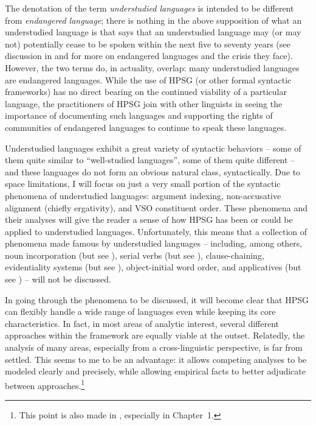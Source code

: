 \documentclass[output=paper
 	        ,biblatex
                ,babelshorthands
                ,newtxmath
                ,draftmode
                ,colorlinks, citecolor=brown
]{langscibook}
\begin{document}
The denotation of the term \textit{understudied languages} is intended to be different from \textit{endangered language}; there is nothing in the above supposition of what an understudied language is that says that an understudied language may (or may not) potentially cease to be spoken within the next five to seventy years (see discussion in \citealt{krauss92} and \citealt{SL13} for more on endangered languages and the crisis they face).  However, the two terms do, in actuality, overlap: many understudied languages are endangered languages. While the use of HPSG (or other formal syntactic frameworks) has no direct bearing on the continued viability of a particular language, the practitioners of HPSG join with other linguists in seeing the importance of documenting such languages and supporting the rights of communities of endangered languages to continue to speak these languages.       

\largerpage
Understudied languages exhibit a great variety of syntactic behaviors -- some of them quite similar to ``well-studied languages'', some of them quite different -- and these languages do not form an obvious natural class, syntactically. Due to space limitations, I will focus on just a very small portion of the syntactic phenomena of understudied languages: argument indexing, non-accusative alignment (chiefly ergativity), and VSO constituent order. These phenomena and their analyses will give the reader a sense of how HPSG has been or could be applied to understudied languages. Unfortunately, this means that a collection of phenomena made famous by understudied languages -- including, among others, noun incorporation (but see \citealt{malouf99,runara03,ball05afla,ball05hpsg,ball08thesis}), serial verbs (but see \citealt{muansuwan01,muansuwan02,KDHB2007a,ML2009a,lee14}), clause-chaining, evidentiality systems (but see \citealt{lee12}), object-initial word order, and applicatives (but see \citealt{runara03,ball08thesis,ball10}) -- will not be discussed.

In going through the phenomena to be discussed, it will become clear that HPSG can flexibly handle a wide range of languages even while keeping its core characteristics. In fact, in most areas of analytic interest, several different approaches within the framework are equally viable at the outset. Relatedly, the analysis of many areas, especially from a cross-linguistic perspective, is far from settled. This seems to me to be an advantage: it allows competing analyses to be modeled clearly and precisely, while allowing empirical facts to better adjudicate between approaches.\footnote{This point is also made in \citet{fokkens14}, especially in Chapter~1.}
\end{document}
